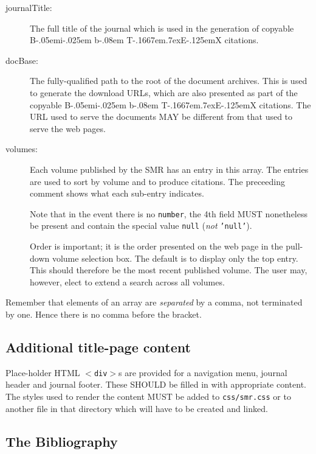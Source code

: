 \documentclass[a4paper,10pt]{SMR}
\def\BibTeX{{\rm B\kern-.05em{\sc i\kern-.025em b}\kern-.08em
    T\kern-.1667em\lower.7ex\hbox{E}\kern-.125emX}}
\begin{document}
\begin{description}
 \item[journalTitle:] The full title of the journal which is used in the
 generation of copyable \BibTeX{} citations.
 \item[docBase:] The fully-qualified path to the root of the document archives.
 This is used to generate the download URLs, which are also presented as part
 of the copyable \BibTeX{} citations. The URL used to serve the documents
 MAY be different from that used to serve the web pages.
 \item[volumes:] Each volume published by the SMR has an entry in this array.
 The entries are used to sort by volume and to produce citations.
 The preceeding comment shows what each sub-entry indicates.
 
 Note that in the event there is no \texttt{number}, the 4th field MUST
 nonetheless be present and contain the special value \texttt{null}
 (\emph{not} \texttt{'null'}).
 
 Order is important; it is the order presented on the web page in the
 pull-down volume selection box. The default is to display only the top
 entry. This should therefore be the most recent published volume.
 The user may, however, elect to extend a search across all volumes.
\end{description}

Remember that elements of an array are \emph{separated} by a comma,
not terminated by one. Hence there is no comma before the bracket.

\subsection{Additional title-page content}

Place-holder HTML \texttt{$<$div$>$}s are provided for a navigation menu,
journal header and journal footer. These SHOULD be filled in with
appropriate content. The styles used to render the content MUST
be added to \texttt{css/smr.css} or to another file in that directory
which will have to be created and linked.

\subsection{The Bibliography}
\end{document}
